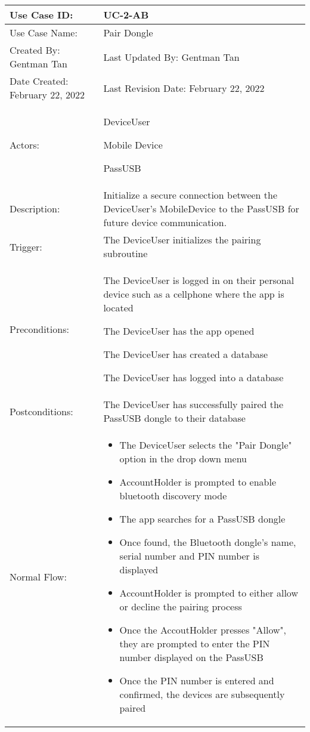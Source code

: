 \documentclass[stu]{apa7}
\newcommand{\nextitem}{\par\hspace*{\labelsep}\textbullet\hspace*{\labelsep}}
\begin{document}
\scriptsize{\begin{xltabular}{\textwidth}{|l|X|}
  \hline Use Case ID: & UC-2-AB \\ \hline

  Use Case Name: & Pair Dongle \\ \hline

  Created By: Gentman Tan & Last Updated By: Gentman Tan\\ \hline

  Date Created: February 22, 2022 & Last Revision Date: February 22, 2022 \\ \hline

  Actors: & \nextitem DeviceUser 
    \nextitem Mobile Device
    \nextitem PassUSB \\ \hline
  
  Description: &  Initialize a secure connection between the DeviceUser’s MobileDevice to the PassUSB for future device communication. \\ \hline

  Trigger: &  The DeviceUser initializes the pairing subroutine \\ \hline

  Preconditions: & \nextitem The DeviceUser is logged in on their personal device such as a cellphone where the app is located \nextitem The DeviceUser has the app opened \nextitem The DeviceUser has created a database \nextitem The DeviceUser has logged into a database \\ \hline

  Postconditions: & \nextitem The DeviceUser has successfully paired the PassUSB dongle to their database  \\ \hline

  Normal Flow: & 
    \begin{itemize}
      \item The DeviceUser selects the "Pair Dongle" option in the drop down menu
      \item AccountHolder is prompted to enable bluetooth discovery mode
      \item The app searches for a PassUSB dongle
      \item Once found, the Bluetooth dongle's name, serial number and PIN number is displayed
      \item AccountHolder is prompted to either allow or decline the pairing process
      \item Once the AccoutHolder presses "Allow", they are prompted to enter the PIN number displayed on the PassUSB
      \item Once the PIN number is entered and confirmed, the devices are subsequently paired
    \end{itemize} \\ \hline


\end{xltabular}}
\end{document}
